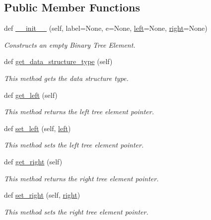 \subsection*{Public Member Functions}
\begin{DoxyCompactItemize}
\item 
def \mbox{\hyperlink{class_bridges_1_1bin__tree__element_1_1_bin_tree_element_a2b1a8f9b4fcf48cd729cbaef55bc6395}{\+\_\+\+\_\+init\+\_\+\+\_\+}} (self, label=None, e=None, \mbox{\hyperlink{class_bridges_1_1bin__tree__element_1_1_bin_tree_element_a1e8797babdfccd26560b34c3971f95d7}{left}}=None, \mbox{\hyperlink{class_bridges_1_1bin__tree__element_1_1_bin_tree_element_a3ba9d7279bf056e6c7d50aaa5d103d49}{right}}=None)
\begin{DoxyCompactList}\small\item\em Constructs an empty Binary Tree Element. \end{DoxyCompactList}\item 
def \mbox{\hyperlink{class_bridges_1_1bin__tree__element_1_1_bin_tree_element_af3618c59a2a576cb47b2f16433fcbac3}{get\+\_\+data\+\_\+structure\+\_\+type}} (self)
\begin{DoxyCompactList}\small\item\em This method gets the data structure type. \end{DoxyCompactList}\item 
def \mbox{\hyperlink{class_bridges_1_1bin__tree__element_1_1_bin_tree_element_a30ee0afc88fdbf55f7b645981dda73f2}{get\+\_\+left}} (self)
\begin{DoxyCompactList}\small\item\em This method returns the left tree element pointer. \end{DoxyCompactList}\item 
def \mbox{\hyperlink{class_bridges_1_1bin__tree__element_1_1_bin_tree_element_a4a86199c8090bcd7e603bccea2b5edff}{set\+\_\+left}} (self, \mbox{\hyperlink{class_bridges_1_1bin__tree__element_1_1_bin_tree_element_a1e8797babdfccd26560b34c3971f95d7}{left}})
\begin{DoxyCompactList}\small\item\em This method sets the left tree element pointer. \end{DoxyCompactList}\item 
def \mbox{\hyperlink{class_bridges_1_1bin__tree__element_1_1_bin_tree_element_ae9e74ea73a3f5c27459344f1db42d9b6}{get\+\_\+right}} (self)
\begin{DoxyCompactList}\small\item\em This method returns the right tree element pointer. \end{DoxyCompactList}\item 
def \mbox{\hyperlink{class_bridges_1_1bin__tree__element_1_1_bin_tree_element_a171c46c251828f265ea8fb60b396f5b7}{set\+\_\+right}} (self, \mbox{\hyperlink{class_bridges_1_1bin__tree__element_1_1_bin_tree_element_a3ba9d7279bf056e6c7d50aaa5d103d49}{right}})
\begin{DoxyCompactList}\small\item\em This method sets the right tree element pointer. \end{DoxyCompactList}\end{DoxyCompactItemize}
